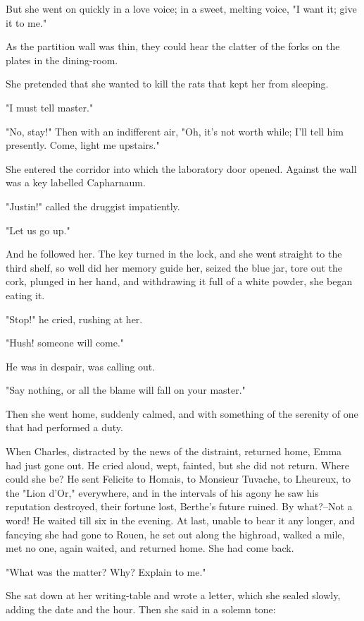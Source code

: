 \documentclass{tufte-book}
\begin{document}
But she went on quickly in a love voice; in a sweet, melting voice, "I
want it; give it to me."

As the partition wall was thin, they could hear the clatter of the forks
on the plates in the dining-room.

She pretended that she wanted to kill the rats that kept her from
sleeping.

"I must tell master."

"No, stay!" Then with an indifferent air, "Oh, it's not worth while;
I'll tell him presently. Come, light me upstairs."

She entered the corridor into which the laboratory door opened. Against
the wall was a key labelled Capharnaum.

"Justin!" called the druggist impatiently.

"Let us go up."

And he followed her. The key turned in the lock, and she went straight
to the third shelf, so well did her memory guide her, seized the blue
jar, tore out the cork, plunged in her hand, and withdrawing it full of
a white powder, she began eating it.

"Stop!" he cried, rushing at her.

"Hush! someone will come."

He was in despair, was calling out.

"Say nothing, or all the blame will fall on your master."

Then she went home, suddenly calmed, and with something of the serenity
of one that had performed a duty.

When Charles, distracted by the news of the distraint, returned home,
Emma had just gone out. He cried aloud, wept, fainted, but she did not
return. Where could she be? He sent Felicite to Homais, to Monsieur
Tuvache, to Lheureux, to the "Lion d'Or," everywhere, and in the
intervals of his agony he saw his reputation destroyed, their fortune
lost, Berthe's future ruined. By what?--Not a word! He waited till six
in the evening. At last, unable to bear it any longer, and fancying she
had gone to Rouen, he set out along the highroad, walked a mile, met no
one, again waited, and returned home. She had come back.

"What was the matter? Why? Explain to me."

She sat down at her writing-table and wrote a letter, which she sealed
slowly, adding the date and the hour. Then she said in a solemn tone:
\end{document}
